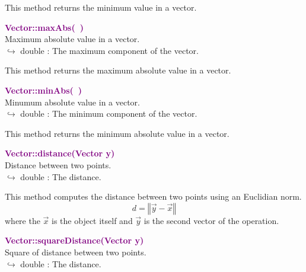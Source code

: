 This method returns the minimum value in a vector.

\textcolor{purple}{\textbf{Vector::maxAbs(~)}}\label{Vector::maxAbs()}\\
Maximum absolute value in a vector.\\ \hspace*{10mm}$\hookrightarrow$ double : The maximum component of the vector.

This method returns the maximum absolute value in a vector.

\textcolor{purple}{\textbf{Vector::minAbs(~)}}\label{Vector::minAbs()}\\
Minumum absolute value in a vector.\\ \hspace*{10mm}$\hookrightarrow$ double : The minimum component of the vector.

This method returns the minimum absolute value in a vector.

\textcolor{purple}{\textbf{Vector::distance(Vector y)}}\label{Vector::distance(Vector y)}\\
Distance between two points.\\ \hspace*{10mm}$\hookrightarrow$ double : The distance.

This method computes the distance between two points using an Euclidian norm.
\begin{equation*}
d = \left\Vert \overrightarrow{y} - \overrightarrow{x} \right\Vert
\end{equation*}
where the $\overrightarrow{x}$ is the object itself and $\overrightarrow{y}$ is the second vector of the operation.

\textcolor{purple}{\textbf{Vector::squareDistance(Vector y)}}\label{Vector::squareDistance(Vector y)}\\
Square of distance between two points.\\ \hspace*{10mm}$\hookrightarrow$ double : The distance.

